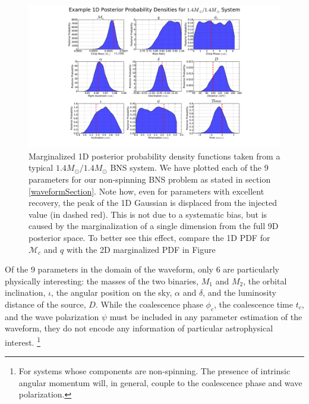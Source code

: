 \documentclass[11pt,a4paper]{emulateapj}
\begin{document}
\begin{figure}[t!]
\centering
\includegraphics[trim=7cm 0cm 0cm 0cm, clip=true,scale=0.55]{9dpdf.pdf}
\caption{Marginalized 1D posterior probability density functions taken from a typical 
$1.4M_{\odot}/1.4M_{\odot}$ BNS system.  We have plotted each of the 9 parameters for 
our non-spinning BNS problem as stated in section \ref{waveformSection}.  Note how, 
even for parameters with excellent recovery, the peak of the 1D Gaussian is displaced from 
the injected value (in dashed red).  This is not due to a systematic bias, but is caused by the 
marginalization of a single dimension from the full 9D posterior space.  To better see this effect, 
compare the 1D PDF for $\mathcal{M}_{c}$ and $q$ with the 2D marginalized PDF in Figure~\label{9dPDF}}
\end{figure}

Of the 9 parameters in the domain of the waveform, only 6 are particularly physically
interesting: the masses of the two binaries, $M_1$ and $M_2$, the orbital inclination,
$\iota$, the angular position on the sky, $\alpha$ and $\delta$, and the luminosity 
distance of the source, $D$.  While the coalescence phase $\phi_c$, the coalescence time
$t_c$, and the wave polarization $\psi$ must be included in any parameter estimation of the 
waveform, they do not encode any information of particular astrophysical interest.
\footnote{For systems whose components are non-spinning.  The presence of intrinsic angular 
momentum will, in general, couple to the coalescence phase and wave polarization.}   
\end{document}
